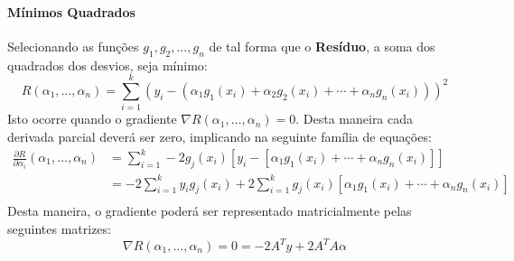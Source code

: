 \documentclass{article}
\begin{document}
                \paragraph{Mínimos Quadrados}Selecionando as funções $g_{1}, g_{2}, \dots, g_{n}$ de tal forma que o \textbf{Resíduo}, a soma dos quadrados dos desvios, seja mínimo:
                \[\boxed{R(\alpha_{1}, \dots, \alpha_{n}) = \sum_{i=1}^{k} (y_{i} - (\alpha_{1} g_{1}(x_{i}) + \alpha_{2} g_{2}(x_{i}) + \cdots + \alpha_{n} g_{n}(x_{i})))^{2}}\]
                Isto ocorre quando o gradiente $\nabla R (\alpha_{1}, \dots, \alpha_{n}) = 0$. Desta maneira cada derivada parcial deverá ser zero, implicando na seguinte família de equações:
                    \[
                        \begin{split}\frac{\partial R}{\partial\alpha_{i}}(\alpha_{1}, \dots, \alpha_{n})
                            &= \sum_{i=1}^{k} -2g_{j}(x_{i})[y_{i} - [\alpha_{1} g_{1}(x_{i}) +
                                                                    \cdots +
                                                                    \alpha_{n} g_{n}(x_{i})]]\\
                            &= -2\sum_{i=1}^{k} y_{i}g_{j}(x_{i}) +
                                2\sum_{i=1}^{k} g_{j}(x_{i})[\alpha_{1} g_{1}(x_{i}) +
                                                            \cdots +
                                                            \alpha_{n} g_{n}(x_{i})]\\
                        \end{split}
                    \]
                Desta maneira, o gradiente poderá ser representado matricialmente pelas seguintes matrizes:
                    \[\boxed{\nabla R(\alpha_{1}, \dots, \alpha_{n}) = 0 = -2A^{T}y + 2A^{T}A\alpha}\]
\end{document}
